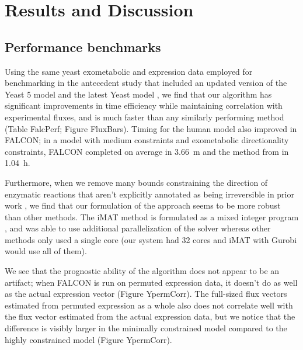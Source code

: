 


\section{Results and Discussion}

\subsection{Performance benchmarks}
Using the same yeast exometabolic and expression data employed for
benchmarking in the antecedent study \citep{Lee2012} that included an
updated version of the Yeast 5 model \citep{Heavner2012} and the latest
Yeast model \citep{Aung2013}, we find that
our algorithm has significant improvements in time efficiency while
maintaining correlation with experimental fluxes, and is much faster 
than any similarly performing method (Table FalcPerf; Figure FluxBars).
Timing for the human model also improved in FALCON; in a model with
medium constraints and exometabolic directionality constraints, FALCON
completed on average in 3.66~m and the method from \citealt{Lee2012} in
1.04~h.

Furthermore, when we remove many bounds constraining the direction of
enzymatic reactions that aren't explicitly annotated as being
irreversible in prior work \citep{Lee2012}, we find that our
formulation of the approach seems to be more robust than other
methods. The iMAT method is formulated as a mixed integer program
\citep{Shlomi2008}, and was able to use additional parallelization of
the solver \citep{gurobi} whereas other methods only used a single
core (our system had 32 cores and iMAT with Gurobi would use all of
them).

We see that the prognostic ability of the algorithm does not
appear to be an artifact; when FALCON is run on permuted expression data,
it doesn't do as well as the actual expression vector (Figure YpermCorr).
The full-sized flux vectors estimated from permuted expression as a
whole also does not correlate well with the flux vector estimated from
the actual expression data, but we notice that the difference is
visibly larger in the minimally constrained model compared to the
highly constrained model (Figure YpermCorr). 

